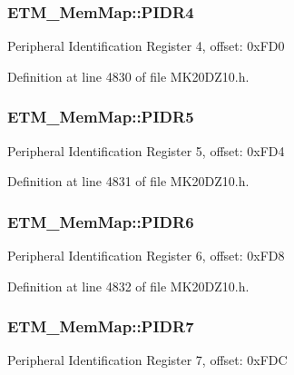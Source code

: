 \subsubsection[{\texorpdfstring{P\+I\+D\+R4}{PIDR4}}]{ E\+T\+M\+\_\+\+Mem\+Map\+::\+P\+I\+D\+R4}\hypertarget{struct_e_t_m___mem_map_a5ee81b650eb5614f457473769ea8fb89}{}\label{struct_e_t_m___mem_map_a5ee81b650eb5614f457473769ea8fb89}
Peripheral Identification Register 4, offset\+: 0x\+F\+D0 

Definition at line 4830 of file M\+K20\+D\+Z10.\+h.

\subsubsection[{\texorpdfstring{P\+I\+D\+R5}{PIDR5}}]{ E\+T\+M\+\_\+\+Mem\+Map\+::\+P\+I\+D\+R5}\hypertarget{struct_e_t_m___mem_map_abc897f6c82134908fb148e9283399e7c}{}\label{struct_e_t_m___mem_map_abc897f6c82134908fb148e9283399e7c}
Peripheral Identification Register 5, offset\+: 0x\+F\+D4 

Definition at line 4831 of file M\+K20\+D\+Z10.\+h.

\subsubsection[{\texorpdfstring{P\+I\+D\+R6}{PIDR6}}]{ E\+T\+M\+\_\+\+Mem\+Map\+::\+P\+I\+D\+R6}\hypertarget{struct_e_t_m___mem_map_a2c8b019b70ddbec18c4ee65fa670f6f7}{}\label{struct_e_t_m___mem_map_a2c8b019b70ddbec18c4ee65fa670f6f7}
Peripheral Identification Register 6, offset\+: 0x\+F\+D8 

Definition at line 4832 of file M\+K20\+D\+Z10.\+h.

\subsubsection[{\texorpdfstring{P\+I\+D\+R7}{PIDR7}}]{ E\+T\+M\+\_\+\+Mem\+Map\+::\+P\+I\+D\+R7}\hypertarget{struct_e_t_m___mem_map_ad50208a539be49c2689ceae20ad53af4}{}\label{struct_e_t_m___mem_map_ad50208a539be49c2689ceae20ad53af4}
Peripheral Identification Register 7, offset\+: 0x\+F\+DC 

